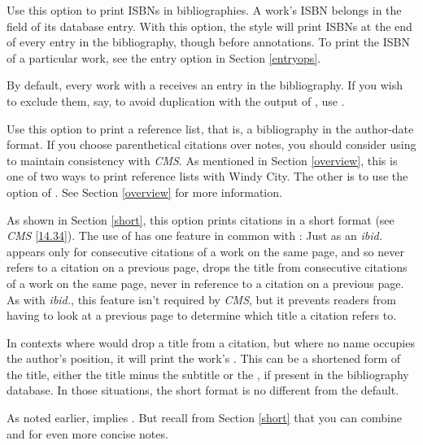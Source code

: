 \documentclass[11pt,letterpaper,oneside]{article}
\begin{document}
\begin{optionlist}

\noindent Use this option to print ISBNs in bibliographies. A work's
ISBN belongs in the  field of its database entry. With
this option, the style will print ISBNs at the end of every entry in
the bibliography, though before annotations. To print the ISBN of a
particular work, see the  entry option in Section
\ref{entryops}.


\noindent By default, every work with a  receives
an entry in the bibliography. If you wish to exclude them, say, to
avoid duplication with the output of , use
.


\noindent Use this option to print a reference list, that is, a
bibliography in the author-date format. If you choose parenthetical
citations over notes, you should consider using  to
maintain consistency with \textit{CMS}. As mentioned in Section
\ref{overview}, this is one of two ways to print reference lists with
Windy City. The other is to use the  option of
. See Section \ref{overview} for more
information.


\noindent As shown in Section \ref{short}, this option prints
citations in a short format (see \textit{CMS} \ref{14.34}). The use of
 has one feature in common with : Just as an
\textit{ibid.} appears only for consecutive citations of a work on the
same page, and so never refers to a citation on a previous page,
 drops the title from consecutive citations of a work on
the same page, never in reference to a citation on a previous page. As
with \textit{ibid.}, this feature isn't required by \textit{CMS}, but
it prevents readers from having to look at a previous page to
determine which title a citation refers to.

In contexts where  would drop a title from a citation, but
where no name occupies the author's position, it will print the work's
. This can be a shortened form of the title,
either the title minus the subtitle or the , if
present in the bibliography database. In those situations, the short
format is no different from the default.

As noted earlier,  implies . But recall
from Section \ref{short} that you can combine  and
 for even more concise notes.

\end{optionlist}
\end{document}
